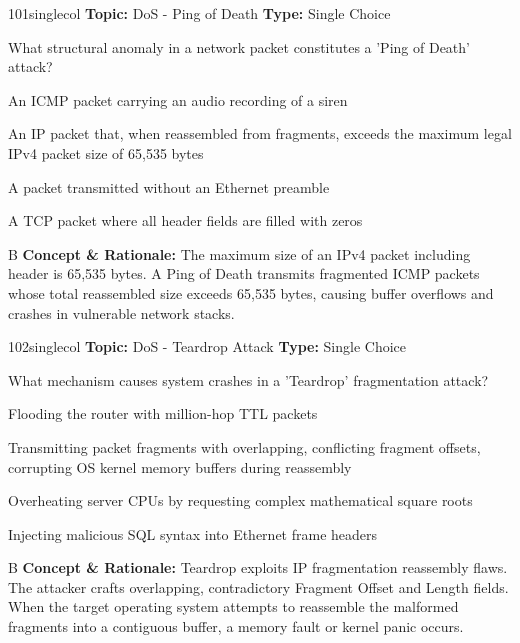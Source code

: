 \begin{qcard}{101}{singlecol}
\textcolor{darkslate!75}{\small\textbf{Topic:} DoS - Ping of Death \hfill \textbf{Type:} Single Choice}\vspace{0.4em}\par
What structural anomaly in a network packet constitutes a 'Ping of Death' attack?
\begin{qoptions}
\item An ICMP packet carrying an audio recording of a siren
\item An IP packet that, when reassembled from fragments, exceeds the maximum legal IPv4 packet size of 65,535 bytes
\item A packet transmitted without an Ethernet preamble
\item A TCP packet where all header fields are filled with zeros
\end{qoptions}
\end{qcard}
\nopagebreak
\begin{explainbox}{B}
\textbf{Concept \& Rationale:} The maximum size of an IPv4 packet including header is 65,535 bytes. A Ping of Death transmits fragmented ICMP packets whose total reassembled size exceeds 65,535 bytes, causing buffer overflows and crashes in vulnerable network stacks.
\end{explainbox}

\begin{qcard}{102}{singlecol}
\textcolor{darkslate!75}{\small\textbf{Topic:} DoS - Teardrop Attack \hfill \textbf{Type:} Single Choice}\vspace{0.4em}\par
What mechanism causes system crashes in a 'Teardrop' fragmentation attack?
\begin{qoptions}
\item Flooding the router with million-hop TTL packets
\item Transmitting packet fragments with overlapping, conflicting fragment offsets, corrupting OS kernel memory buffers during reassembly
\item Overheating server CPUs by requesting complex mathematical square roots
\item Injecting malicious SQL syntax into Ethernet frame headers
\end{qoptions}
\end{qcard}
\nopagebreak
\begin{explainbox}{B}
\textbf{Concept \& Rationale:} Teardrop exploits IP fragmentation reassembly flaws. The attacker crafts overlapping, contradictory Fragment Offset and Length fields. When the target operating system attempts to reassemble the malformed fragments into a contiguous buffer, a memory fault or kernel panic occurs.
\end{explainbox}

